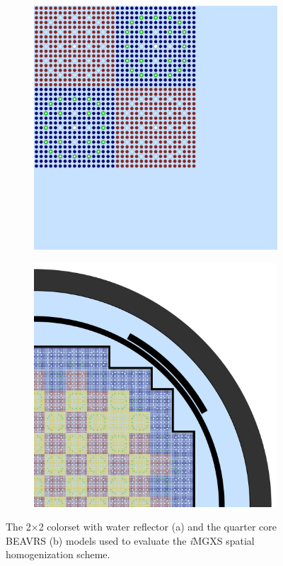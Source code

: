 \documentclass[12pt,twoside]{mitthesis-exec}
\begin{document}
\begin{figure}[h!]
\centering
\begin{subfigure}{0.47\textwidth}
  \centering
  \includegraphics[width=0.93\linewidth]{figures/benchmarks/reflector}
  \caption{}
  \label{fig:reflector}
\end{subfigure}%
\begin{subfigure}{0.47\textwidth}
  \centering
  \includegraphics[width=0.93\linewidth]{figures/benchmarks/quarter-core}
  \caption{}
  \label{fig:full-core}
\end{subfigure}
\caption[PWR benchmarks]{The 2$\times$2 colorset with water reflector (a) and the quarter core BEAVRS (b) models used to evaluate the \textit{i}MGXS spatial homogenization scheme.}
\label{fig:benchmarks}
\end{figure}
\end{document}
